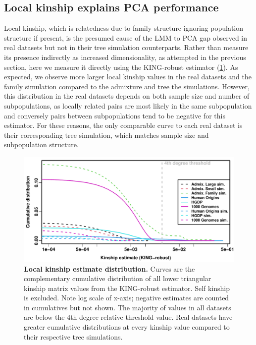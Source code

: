 \documentclass[11pt]{article}
\begin{document}
\subsection{Local kinship explains PCA performance}

Local kinship, which is relatedness due to family structure ignoring population structure if present, is the presumed cause of the LMM to PCA gap observed in real datasets but not in their tree simulation counterparts.
Rather than measure its presence indirectly as increased dimensionality, as attempted in the previous section, here we measure it directly using the KING-robust estimator (\cref{fig:king}).
As expected, we observe more larger local kinship values in the real datasets and the family simulation compared to the admixture and tree the simulations.
However, this distribution in the real datasets depends on both sample size and number of subpopulations, as locally related pairs are most likely in the same subpopulation and conversely pairs between subpopulations tend to be negative for this estimator.
For these reasons, the only comparable curve to each real dataset is their corresponding tree simulation, which matches sample size and subpopulation structure.

\begin{figure}[bp!]
  \centering
  \includegraphics[width=\textwidth]{king_log-x.pdf}
  \caption{
    {\bf Local kinship estimate distribution.}
    Curves are the complementary cumulative distribution of all lower triangular kinship matrix values from the KING-robust estimator.
    Self kinship is excluded.
    Note log scale of x-axis; negative estimates are counted in cumulatives but not shown.
    The majority of values in all datasets are below the 4th degree relative threshold value.
    Real datasets have greater cumulative distributions at every kinship value compared to their respective tree simulations.
  }
  \label{fig:king}
\end{figure}
\end{document}
